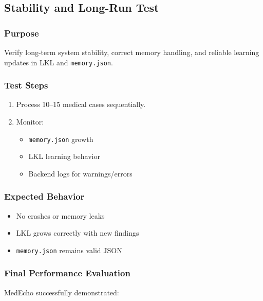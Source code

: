 \subsection{Stability and Long-Run Test}
\label{sec:testing:longrun}

\subsubsection*{Purpose}
Verify long-term system stability, correct memory handling, 
and reliable learning updates in LKL and \texttt{memory.json}.

\subsubsection*{Test Steps}
\begin{enumerate}
    \item Process 10–15 medical cases sequentially.
    \item Monitor:
    \begin{itemize}
        \item \texttt{memory.json} growth
        \item LKL learning behavior
        \item Backend logs for warnings/errors
    \end{itemize}
\end{enumerate}

\subsubsection*{Expected Behavior}
\begin{itemize}
    \item No crashes or memory leaks
    \item LKL grows correctly with new findings
    \item \texttt{memory.json} remains valid JSON
\end{itemize}



\subsubsection*{Final Performance Evaluation}

MedEcho successfully demonstrated:

